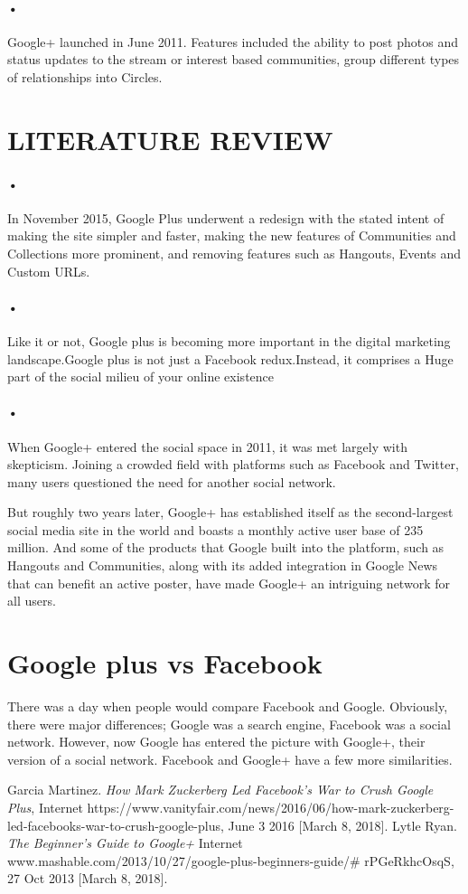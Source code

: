 \documentclass[7pt]{article}
\begin{document}
\paragraph{•}
Google+ launched in June 2011. Features included the ability to post photos and status updates to the stream or interest based communities, group different types of relationships  into Circles.

\section{LITERATURE REVIEW}

\paragraph{•}
In November 2015, Google Plus underwent a redesign with the stated intent of making the site simpler and faster, making the new features of Communities and Collections more prominent, and removing features such as Hangouts, Events and Custom URLs.
\paragraph{•}
Like it or not, Google plus is becoming more important in the digital marketing landscape.Google plus is not just a Facebook redux.Instead, it comprises a Huge part of the social milieu of your online existence
\paragraph{•}
When Google+ entered the social space in 2011, it was met largely with skepticism. Joining a crowded field with platforms such as Facebook and Twitter, many users questioned the need for another social network.

But roughly two years later, Google+ has established itself as the second-largest social media site in the world and boasts a monthly active user base of 235 million. And some of the products that Google built into the platform, such as Hangouts and Communities, along with its added integration in Google News that can benefit an active poster, have made Google+ an intriguing network for all users.\cite{lytle}
\section{Google plus vs Facebook}
There was a day when people would compare Facebook and Google. Obviously, there were major differences; Google was a search engine, Facebook was a social network. However, now Google has entered the picture with Google+, their version of a social network. Facebook and Google+ have a few more similarities.\cite{martinez} 
\begin{thebibliography}{9}
 Garcia Martinez. \textit{How Mark Zuckerberg Led Facebook's War to Crush Google Plus}, Internet https://www.vanityfair.com/news/2016/06/how-mark-zuckerberg-led-facebooks-war-to-crush-google-plus, June 3 2016 [March 8, 2018].
 Lytle Ryan. \textit{The Beginner's Guide to Google+} Internet www.mashable.com/2013/10/27/google-plus-beginners-guide/\# rPGeRkhcOsqS, 27 Oct 2013 [March 8, 2018].
\end{thebibliography}
\end{document}

